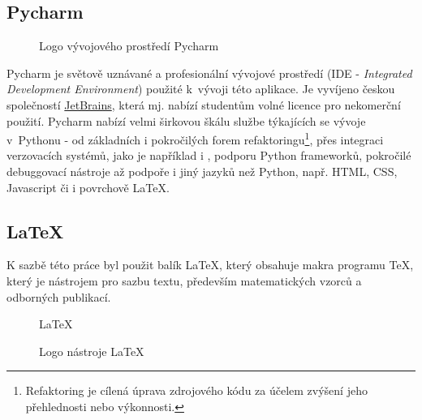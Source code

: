 \begin{sloppypar}
\end{sloppypar}

\subsection{Pycharm}

\begin{figure}[bht]
	\centering
	
	\caption{Logo vývojového prostředí Pycharm}
\end{figure}

Pycharm je světově uznávané a profesionální vývojové prostředí (IDE - \emph{Integrated Development Environment}) použité k~vývoji této aplikace. Je vyvíjeno českou společností \href{https://www.jetbrains.com/}{JetBrains}, která mj. nabízí studentům volné licence pro nekomerční použití. Pycharm nabízí velmi širkovou škálu službe týkajících se vývoje v~Pythonu - od základních i pokročilých forem refaktoringu\footnote{Refaktoring je cílená úprava zdrojového kódu za účelem zvýšení jeho přehlednosti nebo výkonnosti.}, přes integraci verzovacích systémů, jako je například i , podporu Python frameworků, pokročilé debuggovací nástroje až podpoře i jiný jazyků než Python, např. HTML, CSS, Javascript či i povrchově \LaTeX{}.

\subsection{\LaTeX}

K sazbě této práce byl použit balík \LaTeX, který obsahuje makra programu \TeX, který je nástrojem pro sazbu textu, především matematických vzorců a odborných publikací.
\begin{figure}[bht]
	\centering
	\Huge
	\LaTeX
	\caption{Logo nástroje \LaTeX}
\end{figure}
